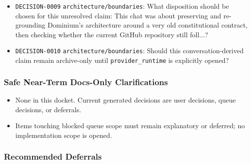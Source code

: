 \documentclass[9pt,a4paper,openany]{book}
\begin{document}
\begin{itemize}
\item \texttt{DECISION-\allowbreak{}0009} \texttt{architecture/\allowbreak{}boundaries}: What disposition should be chosen for this unresolved claim: This chat was about preserving and re-\allowbreak{}grounding Dominium's architecture around a very old constitutional contract, then checking whether the current GitHub repository still foll.\allowbreak{}.\allowbreak{}.\allowbreak{}?
\item \texttt{DECISION-\allowbreak{}0010} \texttt{architecture/\allowbreak{}boundaries}: Should this conversation-\allowbreak{}derived claim remain archive-\allowbreak{}only until \texttt{provider\_\allowbreak{}runtime} is explicitly opened?
\end{itemize}

\subsubsection{Safe Near-Term Docs-Only Clarifications}

\begin{itemize}
\item None in this docket.\allowbreak{} Current generated decisions are user decisions, queue decisions, or deferrals.\allowbreak{}
\item Items touching blocked queue scope must remain explanatory or deferred; no implementation scope is opened.\allowbreak{}
\end{itemize}

\subsubsection{Recommended Deferrals}
\end{document}
